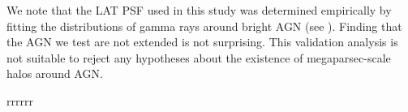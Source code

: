 We note that the LAT PSF used in this study was determined
empirically by fitting the distributions of gamma rays around bright AGN (see
). Finding that the AGN we
test are not extended is not surprising.  This validation analysis is
not suitable to reject any hypotheses about the existence of megaparsec-scale
halos around AGN.





\clearpage
\begin{deluxetable}{rrrrrr}
\tabletypesize{\scriptsize}
\tablewidth{0pt}


\end{deluxetable}
